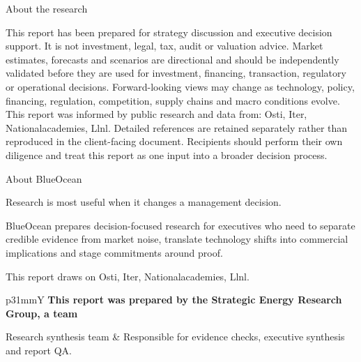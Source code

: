 \documentclass[10pt,a4paper]{article}
\begin{document}
\clearpage
{\sffamily\fontsize{20}{25}\selectfont\color{BONavy} About the research}\par\vspace{6pt}
\vspace{2pt}{\color{BOBright}\rule{\linewidth}{1pt}}\vspace{5pt}
{\footnotesize\color{BOMuted} This report has been prepared for strategy discussion and executive decision support. It is not investment, legal, tax, audit or valuation advice. Market estimates, forecasts and scenarios are directional and should be independently validated before they are used for investment, financing, transaction, regulatory or operational decisions. Forward-looking views may change as technology, policy, financing, regulation, competition, supply chains and macro conditions evolve. This report was informed by public research and data from: Osti, Iter, Nationalacademies, Llnl. Detailed references are retained separately rather than reproduced in the client-facing document. Recipients should perform their own diligence and treat this report as one input into a broader decision process.}

\clearpage
\noindent{}\par\vspace{8pt}
{\sffamily\fontsize{24}{30}\selectfont\color{BONavy} About BlueOcean}\par\vspace{10pt}
\begin{minipage}[t]{0.44\linewidth}
{\sffamily\fontsize{16}{22}\selectfont\color{BOGreen} Research is most useful when it changes a management decision.}\par\vspace{8pt}
{\footnotesize\color{BOText} BlueOcean prepares decision-focused research for executives who need to separate credible evidence from market noise, translate technology shifts into commercial implications and stage commitments around proof.}\par\vspace{7pt}
{\footnotesize\color{BOMuted} This report draws on Osti, Iter, Nationalacademies, Llnl.}\par
\end{minipage}\hfill\begin{minipage}[t]{0.48\linewidth}
\begin{tabularx}{\linewidth}{p{31mm}Y}
{\small\bfseries This report was prepared by the Strategic Energy Research Group, a team}\par{\scriptsize\color{BOGreen} Research synthesis team} & {\footnotesize Responsible for evidence checks, executive synthesis and report QA.} \\[7pt]
\end{tabularx}
\end{minipage}
\end{document}
